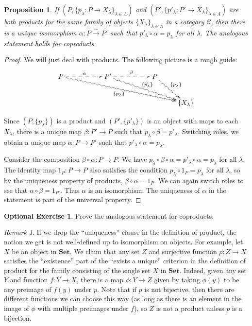 \documentclass{amsart}[12pt]
\def\sC{\mathscr C}
\numberwithin{equation}{section}
\theoremstyle{plain} %
\newtheorem{prop}[equation]{Proposition}
\theoremstyle{definition}
\newtheorem{exer}[equation]{Optional Exercise}
\theoremstyle{remark}
\newtheorem{rem}[equation]{Remark}
\newcommand{\Set}{\mathbf{Set}}
\begin{document}
\begin{prop} If $(P,\{p_\lambda:P\to X_\lambda\}_{\lambda\in \Lambda})$ and $(P',\{p'_\lambda:P'\to X_\lambda\}_{\lambda\in \Lambda})$ are both products for the same family of objects $\{X_\lambda\}_{\lambda\in \Lambda}$ in a category $\sC$, then there is a unique isomorphism $\alpha: P \xrightarrow{\sim} P'$ such that $p'_\lambda \circ \alpha = p_\lambda$ for all $\lambda$. The analogous statement holds for coproducts.
\end{prop}
\begin{proof} We will just deal with products. The following picture is a rough guide:
\[\xymatrix{ P \ar@{-->}[rr]^{\alpha} \ar@{~>}[drrrrr]_-{\{p_\lambda\}}   & & P' \ar@{-->}[rr]^{\beta} \ar@{~>}[drrr]^-{\{p'_\lambda\}} & & P \ar@{~>}[dr]^-{\{p_\lambda\}}   & \\
& & & & & \{ X_\lambda\} }\]

Since $(P,\{p_\lambda\})$ is a product and $(P',\{p'_\lambda\})$ is an object with maps to each $X_\lambda$, there is a unique map $\beta:P'\to P$ such that $p_\lambda\circ \beta = p'_\lambda$. Switching roles, we obtain a unique map $\alpha:P\to P'$ such that $p'_\lambda\circ \alpha = p_\lambda$. 

Consider the composition $\beta\circ \alpha:P\to P$. We have $p_\lambda \circ \beta \circ \alpha = p'_\lambda \circ \alpha = p_\lambda$ for all $\lambda$. The identity map $1_P:P\to P$ also satisfies the condition $p_\lambda \circ 1_P = p_\lambda$ for all $\lambda$, so by the uniqueness property of products, $\beta\circ \alpha = 1_P$. We can again switch roles to see that $\alpha\circ\beta = 1_{P'}$. Thus $\alpha$ is an isomorphism. The uniqueness of $\alpha$ in the statement is part of the universal property.
\end{proof}
\begin{exer} Prove the analogous statement for coproducts.\end{exer}

\begin{rem}
If we drop the ``uniqueness'' clause in the definition of product, the notion we get is not well-defined up to isomorphism on objects. For example, let $X$ be an object in $\Set$. We claim that any set $Z$ and surjective function $p:Z\to X$ satisfies the ``existence''  part of the ``exists a unique'' criterion in the definition of product for the family consisting of the single set $X$ in $\Set$. Indeed, given any set $Y$ and function $f:Y\to X$, there is a map $\phi: Y\to Z$ given by taking $\phi(y)$ to be any preimage of $f(y)$ under $p$. Note that if $p$ is not bijective, then there are different functions we can choose this way (as long as there is an element in the image of $\phi$ with multiple preimages under $f$), so $Z$ is not a product unless $p$ is a bijection.
\end{rem}
\end{document}
